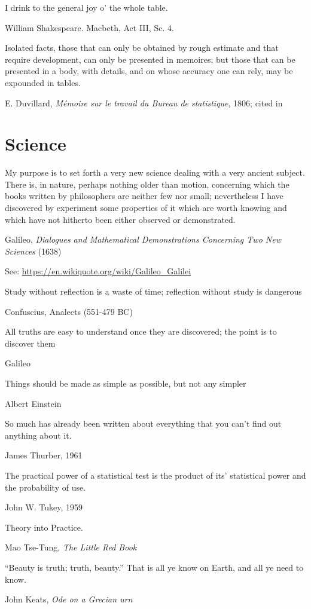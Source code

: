 \epigraph{I drink to the general joy o' the whole table.}{William Shakespeare. Macbeth, Act III, Sc. 4.}

\epigraph{Isolated facts, those that can only be obtained by rough estimate and that require development, can only be presented in memoires; but those that can be presented in a body, with details, and on whose accuracy one can rely, may be expounded in tables.}{E. Duvillard, \emph{M{\'e}moire sur le travail du Bureau de statistique}, 1806; cited in \citet[p. 38]{Derosieres:98}}

 





\section{Science}

\epigraph{My purpose  is to  set forth  a very  new science  dealing with  a very  ancient subject.  There  is, in  nature, perhaps  nothing older than motion, concerning which the books written by philosophers are neither few nor small;  nevertheless I have discovered by experiment some properties of it which are worth knowing and which have not hitherto been either observed or demonstrated.} {Galileo, \emph{Dialogues and Mathematical Demonstrations Concerning Two New Sciences} (1638)}
See: \url{https://en.wikiquote.org/wiki/Galileo_Galilei}

\epigraph{Study without reflection is a waste of time; reflection without study is dangerous}{Confuscius, Analects (551-479 BC)}

\epigraph{All truths are easy to understand once they are discovered; the point is to discover them}{Galileo} 

\epigraph{Things should be made as simple as possible, but not any simpler}{Albert Einstein}

\epigraph{So much has already been written about everything that you can't find out anything about it.}{James Thurber, 1961}

\epigraph{The practical power of a statistical test is the product of its' statistical power and the probability of use.}{John W. Tukey, 1959 \citep{Tukey:59}}

\epigraph{Theory into Practice.}{Mao Tse-Tung, \emph{The Little Red Book}}

\epigraph{``Beauty is truth; truth, beauty.'' That is all ye know on Earth, and all ye need to know.}{John Keats, \emph{Ode on a Grecian urn}}

